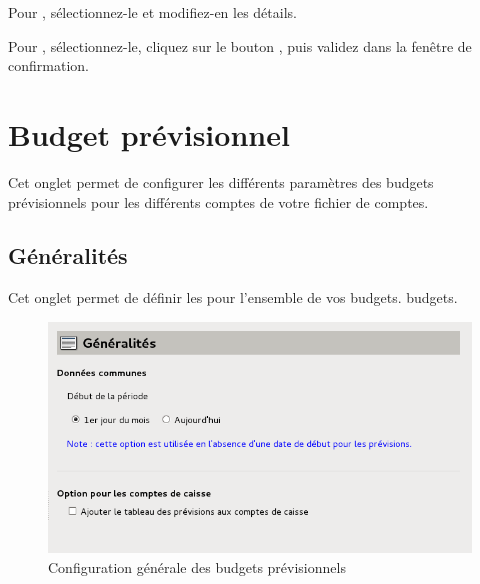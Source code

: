 \ifIllustration
\else
\fi

Pour , sélectionnez-le et modifiez-en les détails.

Pour , sélectionnez-le, cliquez sur le bouton , puis validez dans la fenêtre de confirmation.


\section{Budget prévisionnel\label{setup-budget}}


Cet onglet permet de configurer les différents paramètres des budgets prévisionnels pour les différents comptes de votre fichier de comptes.


\subsection{Généralités\label{setup-budget-general}}

Cet onglet permet de définir les  pour l'ensemble de vos \ifIllustration  budgets.
\else budgets. 
\fi

\ifIllustration
\begin{figure}[h!]
\begin{center}
\includegraphics[scale=0.5]{image/screenshot/setup_budget_general}
\end{center}
\caption{Configuration générale des budgets prévisionnels}
\label{setup-budgetGeneral-img}
\end{figure}
\fi

